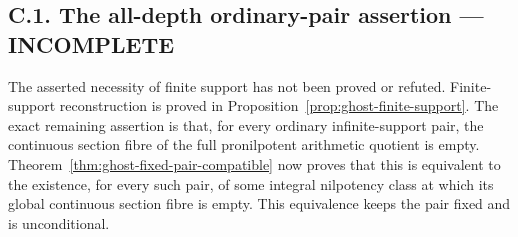 \subsection*{C.1. The all-depth ordinary-pair assertion --- INCOMPLETE}
\label{task:ghost-c1}
The asserted necessity of finite support has not been proved or
refuted. Finite-support reconstruction is proved in
Proposition~\ref{prop:ghost-finite-support}. The exact remaining
assertion is that, for every ordinary infinite-support pair,
the continuous section fibre of the full pronilpotent arithmetic
quotient is empty. Theorem~\ref{thm:ghost-fixed-pair-compatible}
now proves that this is equivalent to the existence, for every
such pair, of some integral nilpotency class at which its
global continuous section fibre is empty. This equivalence
keeps the pair fixed and is unconditional.

